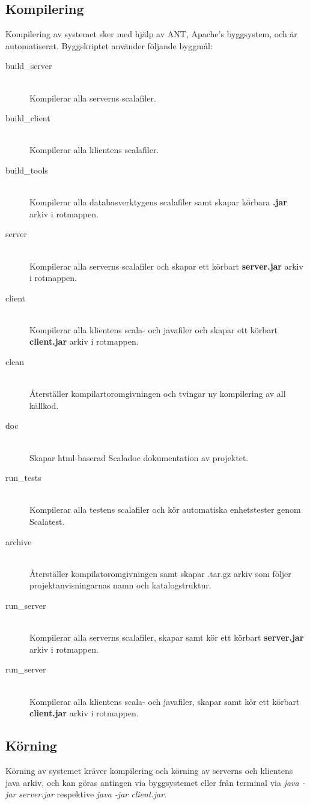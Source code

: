 \documentclass[a4paper]{article}
\begin{document}
\subsection{Kompilering}
Kompilering av systemet sker med hjälp av ANT, Apache's byggsystem, och är automatiserat. Byggskriptet använder följande byggmål:
\begin{description}
\item[build\_server] \hfill \\ Kompilerar alla serverns scalafiler.
\item[build\_client] \hfill \\ Kompilerar alla klientens scalafiler.
\item[build\_tools] \hfill \\ Kompilerar alla databasverktygens scalafiler samt skapar körbara \textbf{.jar} arkiv i rotmappen.
\item[server] \hfill \\ Kompilerar alla serverns scalafiler och skapar ett körbart \textbf{server.jar} arkiv i rotmappen.
\item[client] \hfill \\ Kompilerar alla klientens scala- och javafiler och skapar ett körbart \textbf{client.jar} arkiv i rotmappen.
\item[clean] \hfill \\ Återställer kompilartoromgivningen och tvingar ny kompilering av all källkod.
\item[doc] \hfill \\ Skapar html-baserad Scaladoc dokumentation av projektet.
\item[run\_tests] \hfill \\ Kompilerar alla testens scalafiler och kör automatiska enhetstester genom Scalatest.
\item[archive] \hfill \\ Återställer kompilatoromgivningen samt skapar .tar.gz arkiv som följer projektanvisningarnas namn och katalogstruktur.
\item[run\_server] \hfill \\ Kompilerar alla serverns scalafiler, skapar samt kör ett körbart \textbf{server.jar} arkiv i rotmappen.
\item[run\_server] \hfill \\ Kompilerar alla klientens scala- och javafiler, skapar samt kör ett körbart \textbf{client.jar} arkiv i rotmappen.
\end{description}

\subsection{Körning}
Körning av systemet kräver kompilering och körning av serverns och klientens java arkiv, och kan göras antingen via byggsystemet
eller från terminal via \textit{java -jar server.jar} respektive  \textit{java -jar client.jar}.
\end{document}
